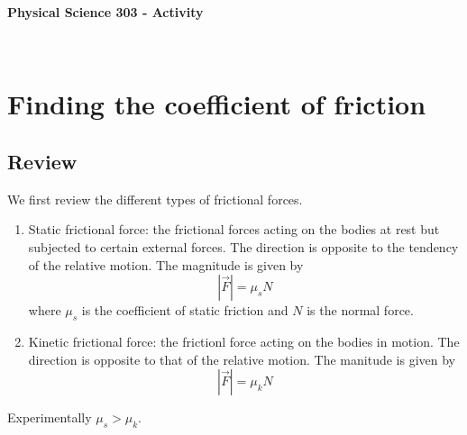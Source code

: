 \documentclass[10pt]{article}
\date{2014-6-22}
\begin{document}
\begin{center}
\begin{Large}\textbf{Physical Science 303 - Activity}\end{Large} \\
\smallskip
\end{center}

\section{Finding the coefficient of friction}
\subsection{Review}
We first review the different types of frictional forces.
\begin{enumerate}
\item Static frictional force: the frictional forces acting on the bodies at rest but subjected to certain external forces.  The direction is opposite to the tendency of the relative motion.  The magnitude is given by
  \begin{equation}
    |\vec{F}| = \mu_{s}N
  \end{equation}
where $\mu_s$ is the coefficient of static friction and $N$ is the normal force. 
\item Kinetic frictional force: the frictionl force acting on the bodies in motion.  The direction is opposite to that of the relative motion.  The manitude is given by
  \begin{equation}
    |\vec{F}| = \mu_{k}N
  \end{equation}
\end{enumerate}
Experimentally $\mu_s>\mu_k$.  
\end{document}
